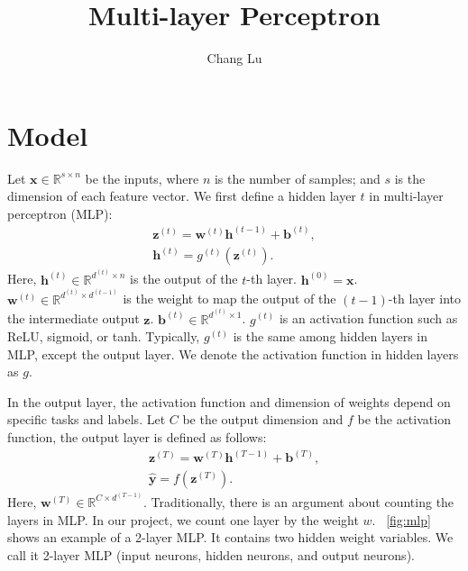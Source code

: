\documentclass{article}
\title{Multi-layer Perceptron}
\author{Chang Lu}
\begin{document}
\maketitle

\section{Model}
Let $\mathbf{x} \in \mathbb{R}^{s \times n}$ be the inputs, where $n$ is the number of samples; and $s$ is the dimension of each feature vector. We first define a hidden layer $t$ in multi-layer perceptron (MLP):
\begin{gather}
    \mathbf{z}^{(t)} = \mathbf{w}^{(t)}\mathbf{h}^{(t - 1)} + \mathbf{b}^{(t)}, \label{eq:mlp1}\\
    \mathbf{h}^{(t)} = g^{(t)}\left(\mathbf{z}^{(t)}\right).
\end{gather}
Here, $\mathbf{h}^{(t)} \in \mathbb{R}^{d^{(t)} \times n}$ is the output of the $t$-th layer. $\mathbf{h}^{(0)} = \mathbf{x}$. $\mathbf{w}^{(t)} \in \mathbb{R}^{d^{(t)} \times d^{(t - 1)}}$ is the weight to map the output of the $(t - 1)$-th layer into the intermediate output $\mathbf{z}$. $\mathbf{b}^{(t)} \in \mathbb{R}^{d^{(t)} \times 1}$. $g^{(t)}$ is an activation function such as ReLU, sigmoid, or tanh. Typically, $g^{(t)}$ is the same among hidden layers in MLP, except the output layer. We denote the activation function in hidden layers as $g$.

In the output layer, the activation function and dimension of weights depend on specific tasks and labels. Let $C$ be the output dimension and $f$ be the activation function, the output layer is defined as follows:
\begin{gather}
    \mathbf{z}^{(T)} = \mathbf{w}^{(T)}\mathbf{h}^{(T - 1)} + \mathbf{b}^{(T)}, \\
    \hat{\mathbf{y}} = f\left(\mathbf{z}^{(T)}\right).
\end{gather}
Here, $\mathbf{w}^{(T)} \in \mathbb{R}^{C \times d^{(T - 1)}}$. Traditionally, there is an argument about counting the layers in MLP. In our project, we count one layer by the weight $w$. \figurename{~\ref{fig:mlp}} shows an example of a 2-layer MLP. It contains two hidden weight variables. We call it 2-layer MLP (input neurons, hidden neurons, and output neurons).
\end{document}
